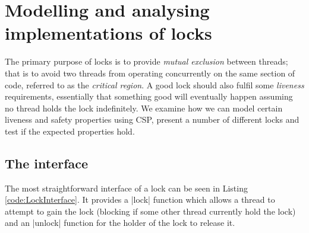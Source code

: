 \section{Modelling and analysing implementations of locks}
\label{sec:locks}





The primary purpose of locks is to provide \emph{mutual exclusion} between threads; that is to avoid two threads from operating concurrently on the same section of code, referred to as the \emph{critical region}. A good lock should also fulfil some \emph{liveness} requirements, essentially that something good will eventually happen assuming no thread holds the lock indefinitely. We examine how we can model certain liveness and safety properties using CSP, present a number of different locks and test if the expected properties hold.


\subsection{The interface}


The most straightforward interface of a lock can be seen in Listing \ref{code:LockInterface}. It provides a |lock| function which allows a thread to attempt to gain the lock (blocking if some other thread currently hold the lock) and an |unlock| function for the holder of the lock to release it. 

